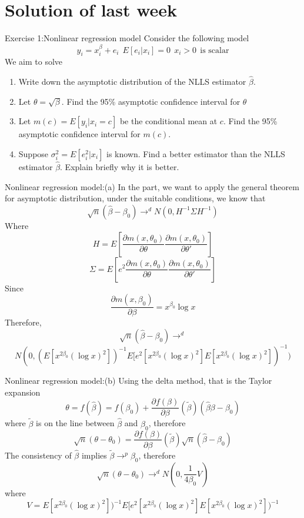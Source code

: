 \documentclass{beamer}
\begin{document}
\section{Solution of last week}
\begin{frame}{Exercise 1:Nonlinear regression model}
	Consider the following model
	\[y_i = x^{\beta}_i + e_i \ \ E[e_i|x_i]=0 \ \ x_i >0 \ \ \text{is scalar}\]
	We aim to solve 
	\begin{enumerate}
		\item Write down the asymptotic distribution of the NLLS estimator $\hat{\beta}$.
		\item Let $\theta = \sqrt{\beta}$. Find the 95\% asymptotic confidence interval for $\theta$
		\item Let $m(c) = E[y_i|x_i=c]$ be the conditional mean at $c$. Find the 95\% asymptotic confidence interval for $m(c)$.
		\item Suppose $\sigma^2_i = E[e^2_i|x_i]$ is known. Find a better estimator than the NLLS estimator $\hat{\beta}$. Explain briefly why it is better.
	\end{enumerate}
\end{frame}
\begin{frame}{Nonlinear regression model:(a)}
	In the part, we want to apply the general theorem for asymptotic distribution, under the suitable conditions, we know that 
	\[\sqrt{n}(\hat{\beta} - \beta_0) \rightarrow^d N(0,H^{-1} \Sigma H^{-1})\]
	Where
	\[H = E[\frac{\partial m(x,\theta_0)}{\partial \theta} \frac{\partial m(x, \theta_0)}{ \partial \theta'}]\]
	\[\Sigma = E[e^2 \frac{\partial m(x,\theta_0)}{\partial \theta} \frac{\partial m(x, \theta_0)}{ \partial \theta'}]\]
	Since 
	\[\frac{\partial m(x,\beta_0)}{\partial \beta} = x^{\beta_0} \log x\]
	Therefore,
\[\sqrt{n}(\hat{\beta} - \beta_0) \rightarrow^d \]
\[ N(0, (E[x^{2\beta_0} (\log x)^2])^{-1} E[e^2[x^{2\beta_0} (\log x)^2] E[x^{2\beta_0} (\log x)^2])^{-1})\]

\end{frame}
\begin{frame}{Nonlinear regression model:(b)}
	Using the delta method, that is the Taylor expansion
	\[\theta = f(\hat{\beta}) = f(\beta_0) + \frac{\partial f(\beta)}{\partial \beta}(\tilde{\beta}) (\hat{\beta}\beta - \beta_0)\]
	where $\tilde{\beta}$ is on the line between $\hat{\beta}$ and $\beta_0$, therefore
	\[\sqrt{n}(\theta - \theta_0) = \frac{\partial f(\beta)}{\partial \beta}(\tilde{\beta}) \sqrt{n}(\hat{\beta} - \beta_0)\]
	The consistency of $\hat{\beta}$ implies $\tilde{\beta} \rightarrow^p \beta_0$, therefore
	\[\sqrt{n}(\theta - \theta_0) \rightarrow^d N(0,\frac{1}{4\beta_0} V)\]
	where
\[V = E[x^{2\beta_0} (\log x)^2])^{-1} E[e^2[x^{2\beta_0} (\log x)^2] E[x^{2\beta_0} (\log x)^2])^{-1}\]
\end{frame}
\end{document}
